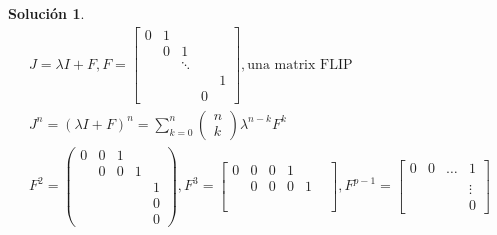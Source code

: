 \documentclass[11pt, a4paper]{article}
\newif\IfInSansMode
\theoremstyle{theorem-style}
\theoremstyle{definition-style}
\theoremstyle{remark-style}
\newtheorem*{sol}{Solución}
\theoremstyle{example-style}
\begin{document}
\begin{sol}
        \begin{align*}
            \label{}
            J = \lambda I + F , F = \begin{bmatrix}
                0 & 1 & & & \\
                  & 0 & 1 & & \\
                  & & \ddots & & \\
                & & & & 1 \\
                & & & 0 & 
            \end{bmatrix}, \text{una matrix FLIP} \\
            J^n = (\lambda I + F)^n = \sum^{n}_{k=0} \begin{pmatrix}
                n \\
                k
            \end{pmatrix} \lambda^{n-k} F^k \\
            F^2 = \begin{pmatrix}
                0 & 0 & 1 & & \\
                  & 0 & 0 & 1 & \\
                  & & & & 1 \\
                  & & & & 0 \\
                  & & & & 0
            \end{pmatrix}, F^3 = \begin{bmatrix}
                0 & 0 & 0 & 1 & & \\
                 & 0 & 0 & 0 & 1 \\
                 & & & & & \\
                 & & & & & \\
                 & && & &
            \end{bmatrix}, F^{p-1} = \begin{bmatrix}
                0 & 0 & \hdots& 1 \\
                  & & & \\
                  & & & \vdots \\
                  & & & 0
            \end{bmatrix}
        \end{align*}


\end{sol}
\end{document}
